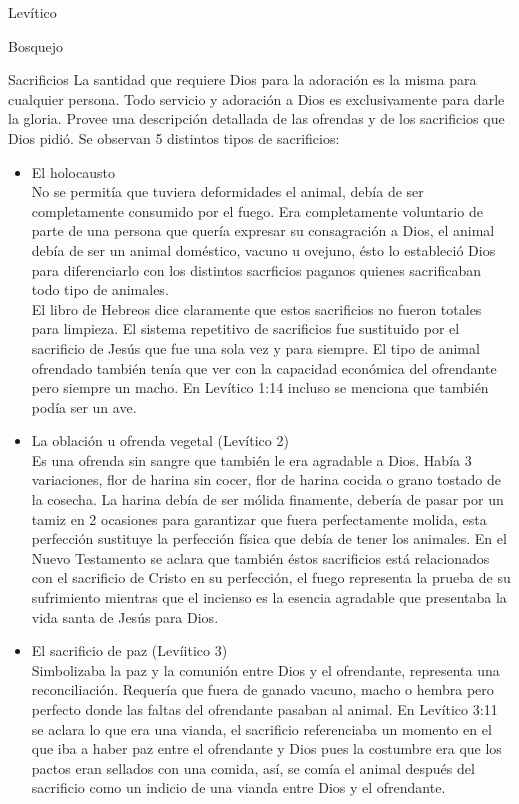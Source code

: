 \begin{section}{Levítico}
\begin{itemize}
\end{itemize}
\begin{subsection}{Bosquejo}
	\begin{subsubsection}{Sacrificios}
		La santidad que requiere Dios para la adoración es la misma para cualquier persona. Todo servicio y adoración a Dios es exclusivamente para darle la gloria. Provee una descripción detallada de las ofrendas y de los sacrificios que Dios pidió. Se observan 5 distintos tipos de sacrificios:
		\begin{itemize}
			\item El holocausto\\
				No se permitía que tuviera deformidades el animal, debía de ser completamente consumido por el fuego. Era completamente voluntario de parte de una persona que quería expresar su consagración a Dios, el animal debía de ser un animal doméstico, vacuno u ovejuno, ésto lo estableció Dios para diferenciarlo con los distintos sacrficios paganos quienes sacrificaban todo tipo de animales.\\
				El libro de Hebreos dice claramente que estos sacrificios no fueron totales para limpieza. El sistema repetitivo de sacrificios fue sustituido por el sacrificio de Jesús que fue una sola vez y para siempre.\newpage
				El tipo de animal ofrendado también tenía que ver con la capacidad económica del ofrendante pero siempre un macho. En Levítico 1:14 incluso se menciona que también podía ser un ave.
			\item La oblación u ofrenda vegetal (Levítico 2)\\
				Es una ofrenda sin sangre que también le era agradable a Dios. Había 3 variaciones, flor de harina sin cocer, flor de harina cocida o grano tostado de la cosecha. La harina debía de ser mólida finamente, debería de pasar por un tamiz en 2 ocasiones para garantizar que fuera perfectamente molida, esta perfección sustituye la perfección física que debía de tener los animales. En el Nuevo Testamento se aclara que también éstos sacrificios está relacionados con el sacrificio de Cristo en su perfección, el fuego representa la prueba de su sufrimiento mientras que el incienso es la esencia agradable que presentaba la vida santa de Jesús para Dios.
			\item El sacrificio de paz (Levíitico 3)\\
				Simbolizaba la paz y la comunión entre Dios y el ofrendante, representa una reconciliación. Requería que fuera de ganado vacuno, macho o hembra pero perfecto donde las faltas del ofrendante pasaban al animal. En Levítico 3:11 se aclara lo que era una vianda, el sacrificio referenciaba un momento en el que iba a haber paz entre el ofrendante y Dios pues la costumbre era que los pactos eran sellados con una comida, así,  se comía el animal después del sacrificio como un indicio de una vianda entre Dios y el ofrendante.

\end{itemize}
\end{subsubsection}
\end{subsection}
\end{section}
